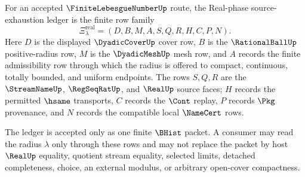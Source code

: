 \begin{definition}
\label{def:finite-lebesgue-number-real-phase-source-exhaustion-ledger}
For an accepted $\FiniteLebesgueNumberUp$ route, the Real-phase source-exhaustion ledger is the finite row family
$$
\Xi_{\lambda}^{\mathrm{real}}=(D,B,M,A,S,Q,R,H,C,P,N).
$$
Here $D$ is the displayed $\DyadicCoverUp$ cover row, $B$ is the $\RationalBallUp$ positive-radius row, $M$ is the $\DyadicMeshUp$ mesh row, and $A$ records the finite admissibility row through which the radius is offered to compact, continuous, totally bounded, and uniform endpoints. The rows $S,Q,R$ are the $\StreamNameUp$, $\RegSeqRatUp$, and $\RealUp$ source faces; $H$ records the permitted $\hsame$ transports, $C$ records the $\Cont$ replay, $P$ records $\Pkg$ provenance, and $N$ records the compatible local $\NameCert$ rows.

The ledger is accepted only as one finite $\BHist$ packet. A consumer may read the radius $\lambda$ only through these rows and may not replace the packet by host $\RealUp$ equality, quotient stream equality, selected limits, detached completeness, choice, an external modulus, or arbitrary open-cover compactness.
\end{definition}

